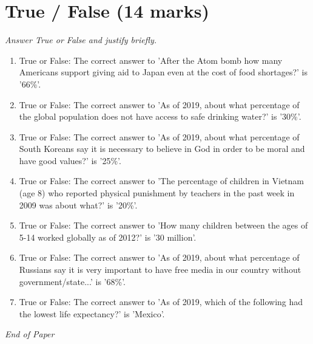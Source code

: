 \documentclass[12pt]{article}
\begin{document}
\section*{True / False (14 marks)}
\textit{Answer True or False and justify briefly.}
\begin{enumerate}[label=\arabic*.]
\item True or False: The correct answer to 'After the Atom bomb how many Americans support giving aid to Japan even at the cost of food shortages?' is '66\%'.
\item True or False: The correct answer to 'As of 2019, about what percentage of the global population does not have access to safe drinking water?' is '30\%'.
\item True or False: The correct answer to 'As of 2019, about what percentage of South Koreans say it is necessary to believe in God in order to be moral and have good values?' is '25\%'.
\item True or False: The correct answer to 'The percentage of children in Vietnam (age 8) who reported physical punishment by teachers in the past week in 2009 was about what?' is '20\%'.
\item True or False: The correct answer to 'How many children between the ages of 5-14 worked globally as of 2012?' is '30 million'.
\item True or False: The correct answer to 'As of 2019, about what percentage of Russians say it is very important to have free media in our country without government/state...' is '68\%'.
\item True or False: The correct answer to 'As of 2019, which of the following had the lowest life expectancy?' is 'Mexico'.
\end{enumerate}

\vfill
\noindent\textit{End of Paper}
\end{document}
